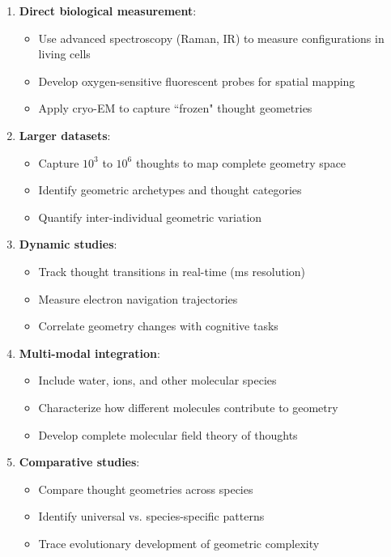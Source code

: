 \documentclass[12pt,a4paper]{article}
\begin{document}
\begin{enumerate}
\item \textbf{Direct biological measurement}:
   \begin{itemize}
   \item Use advanced spectroscopy (Raman, IR) to measure  configurations in living cells
   \item Develop oxygen-sensitive fluorescent probes for spatial mapping
   \item Apply cryo-EM to capture ``frozen" thought geometries
   \end{itemize}

\item \textbf{Larger datasets}:
   \begin{itemize}
   \item Capture $10^3$ to $10^6$ thoughts to map complete geometry space
   \item Identify geometric archetypes and thought categories
   \item Quantify inter-individual geometric variation
   \end{itemize}

\item \textbf{Dynamic studies}:
   \begin{itemize}
   \item Track thought transitions in real-time (ms resolution)
   \item Measure electron navigation trajectories
   \item Correlate geometry changes with cognitive tasks
   \end{itemize}

\item \textbf{Multi-modal integration}:
   \begin{itemize}
   \item Include water, ions, and other molecular species
   \item Characterize how different molecules contribute to geometry
   \item Develop complete molecular field theory of thoughts
   \end{itemize}

\item \textbf{Comparative studies}:
   \begin{itemize}
   \item Compare thought geometries across species
   \item Identify universal vs. species-specific patterns
   \item Trace evolutionary development of geometric complexity
   \end{itemize}
\end{enumerate}
\end{document}
